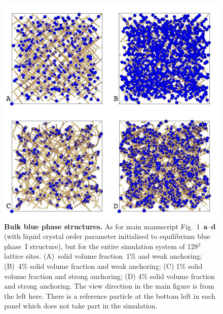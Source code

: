 \documentclass[12pt,twoside]{article}
\begin{document}
\begin{figure}[!h]
\begin{center}
\includegraphics[scale=0.35]{support-fig2.pdf}
\end{center}
\caption{\textbf{Bulk blue phase structures.}
As for main manuscript Fig.~1~\textbf{a}--\textbf{d}
(with liquid crystal order parameter
initialised to equilibrium blue phase~I structure), but for the entire
simulation system of 128$^3$ lattice sites. (A)~solid volume fraction~1\%
and weak anchoring;  (B)~4\% solid volume fraction and weak anchoring;
(C) 1\% solid volume fraction and strong anchoring; (D) 4\% solid
volume fraction and strong anchoring. The view direction in the
main figure is from the left here. There is a reference
particle at the bottom left in each panel which does not take part
in the simulation.}
\end{figure}

\newpage
\end{document}
